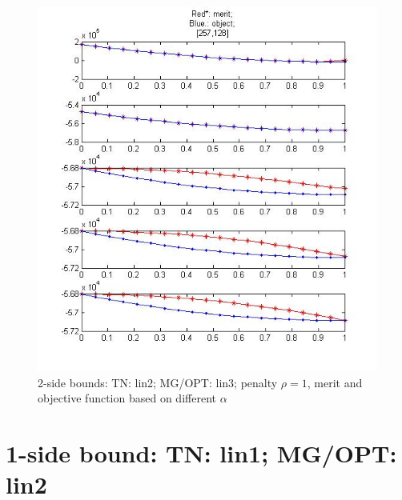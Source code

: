 \documentclass[10pt]{article}
\begin{document}
 
\begin{figure}
  \centering
  \includegraphics[width=1\textwidth]{merit23}
  \caption{2-side bounds: TN: lin2; MG/OPT: lin3; penalty $\rho=1$, merit and objective function based on different $\alpha$}
  \label{fig:merit23}
\end{figure}


\section{1-side bound: TN: lin1; MG/OPT: lin2}
\end{document}
